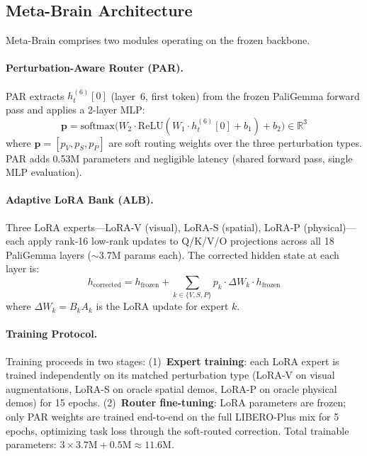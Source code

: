 \documentclass[10pt,twocolumn]{article}
\newcommand{\ours}{Meta-Brain}
\newcommand{\liplus}{LIBERO-Plus}
\begin{document}
\subsection{\ours{} Architecture}
\label{sec:architecture}

\ours{} comprises two modules operating on the frozen backbone.

\paragraph{Perturbation-Aware Router (PAR).}
PAR extracts $h_t^{(6)}[0]$ (layer~6, first token) from the frozen PaliGemma forward pass and applies a 2-layer MLP:
\begin{equation}
    \mathbf{p} = \text{softmax}\!\big(W_2 \cdot \text{ReLU}(W_1 \cdot h_t^{(6)}[0] + b_1) + b_2\big) \in \mathbb{R}^3
    \label{eq:par}
\end{equation}
where $\mathbf{p} = [p_V, p_S, p_P]$ are soft routing weights over the three perturbation types.
PAR adds 0.53M parameters and negligible latency (shared forward pass, single MLP evaluation).

\paragraph{Adaptive LoRA Bank (ALB).}
Three LoRA experts---LoRA-V (visual), LoRA-S (spatial), LoRA-P (physical)---each apply rank-16 low-rank updates to Q/K/V/O projections across all 18 PaliGemma layers (${\sim}3.7$M params each).
The corrected hidden state at each layer is:
\begin{equation}
    h_{\text{corrected}} = h_{\text{frozen}} + \sum_{k \in \{V,S,P\}} p_k \cdot \Delta W_k \cdot h_{\text{frozen}}
    \label{eq:correction}
\end{equation}
where $\Delta W_k = B_k A_k$ is the LoRA update for expert $k$.

\paragraph{Training Protocol.}
Training proceeds in two stages:
(1)~\textbf{Expert training}: each LoRA expert is trained independently on its matched perturbation type (LoRA-V on visual augmentations, LoRA-S on oracle spatial demos, LoRA-P on oracle physical demos) for 15 epochs.
(2)~\textbf{Router fine-tuning}: LoRA parameters are frozen; only PAR weights are trained end-to-end on the full \liplus{} mix for 5 epochs, optimizing task loss through the soft-routed correction.
Total trainable parameters: $3 \times 3.7\text{M} + 0.5\text{M} \approx 11.6\text{M}$.
\end{document}
